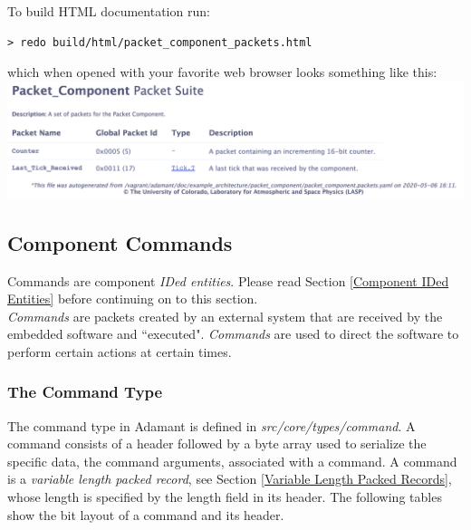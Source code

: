 To build HTML documentation run:

\vspace{5mm} %
\begin{verbatim}
> redo build/html/packet_component_packets.html
\end{verbatim}
\vspace{5mm} %

which when opened with your favorite web browser looks something like this: \\

\vspace{5mm} %
\includegraphics[width=\textwidth]{images/packetshtml.png}
\vspace{5mm} %

\subsection{Component Commands} \label{Commands}

Commands are component \textit{IDed entities}. Please read Section \ref{Component IDed Entities} before continuing on to this section. \\

\textit{Commands} are packets created by an external system that are received by the embedded software and ``executed". \textit{Commands} are used to direct the software to perform certain actions at certain times.

\subsubsection{The Command Type}

The command type in Adamant is defined in \textit{src/core/types/command}. A command consists of a header followed by a byte array used to serialize the specific data, the command arguments, associated with a command. A command is a \textit{variable length packed record}, see Section \ref{Variable Length Packed Records}, whose length is specified by the length field in its header. The following tables show the bit layout of a command and its header. \\

